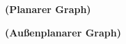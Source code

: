 \begin{defi}{\textbf{(Planarer Graph)}}\\
\end{defi}


\begin{defi}{\textbf{(Außenplanarer Graph)}}\\
\end{defi}

\newpage
